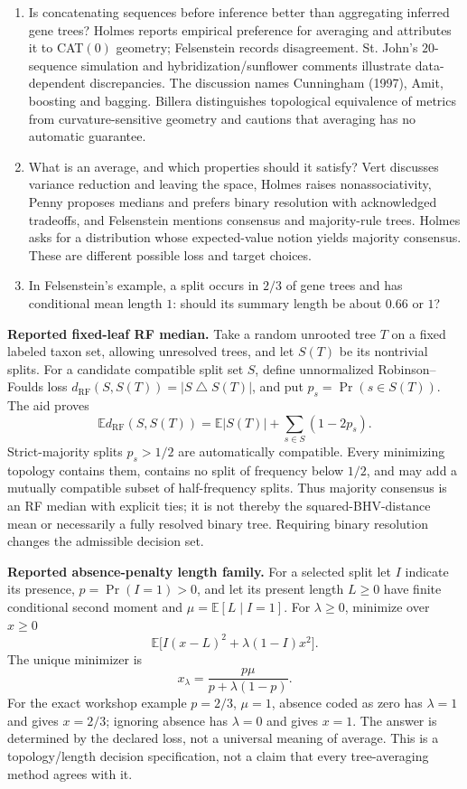 \documentclass[11pt]{article}
\newcommand{\E}{\mathbb{E}}
\begin{document}
\begin{enumerate}
\item Is concatenating sequences before inference better than aggregating inferred gene trees? Holmes reports empirical preference for averaging and attributes it to CAT$(0)$ geometry; Felsenstein records disagreement. St. John's $20$-sequence simulation and hybridization/sunflower comments illustrate data-dependent discrepancies. The discussion names Cunningham (1997), Amit, boosting and bagging. Billera distinguishes topological equivalence of metrics from curvature-sensitive geometry and cautions that averaging has no automatic guarantee.
\item What is an average, and which properties should it satisfy? Vert discusses variance reduction and leaving the space, Holmes raises nonassociativity, Penny proposes medians and prefers binary resolution with acknowledged tradeoffs, and Felsenstein mentions consensus and majority-rule trees. Holmes asks for a distribution whose expected-value notion yields majority consensus. These are different possible loss and target choices.
\item In Felsenstein's example, a split occurs in $2/3$ of gene trees and has conditional mean length $1$: should its summary length be about $0.66$ or $1$?
\end{enumerate}

\textbf{Reported fixed-leaf RF median.} Take a random unrooted tree $T$ on a fixed labeled taxon set, allowing unresolved trees, and let $S(T)$ be its nontrivial splits. For a candidate compatible split set $S$, define unnormalized Robinson--Foulds loss $d_{\mathrm{RF}}(S,S(T))=|S\mathbin{\triangle}S(T)|$, and put $p_s=\Pr(s\in S(T))$. The aid proves
\[
 \E d_{\mathrm{RF}}(S,S(T))=\E|S(T)|+\sum_{s\in S}(1-2p_s).
\]
Strict-majority splits $p_s>1/2$ are automatically compatible. Every minimizing topology contains them, contains no split of frequency below $1/2$, and may add a mutually compatible subset of half-frequency splits. Thus majority consensus is an RF median with explicit ties; it is not thereby the squared-BHV-distance mean or necessarily a fully resolved binary tree. Requiring binary resolution changes the admissible decision set.

\textbf{Reported absence-penalty length family.} For a selected split let $I$ indicate its presence, $p=\Pr(I=1)>0$, and let its present length $L\geq0$ have finite conditional second moment and $\mu=\E[L\mid I=1]$. For $\lambda\geq0$, minimize over $x\geq0$
\[
 \E\big[I(x-L)^2+\lambda(1-I)x^2\big].
\]
The unique minimizer is
\[
 x_\lambda=\frac{p\mu}{p+\lambda(1-p)}.
\]
For the exact workshop example $p=2/3$, $\mu=1$, absence coded as zero has $\lambda=1$ and gives $x=2/3$; ignoring absence has $\lambda=0$ and gives $x=1$. The answer is determined by the declared loss, not a universal meaning of average. This is a topology/length decision specification, not a claim that every tree-averaging method agrees with it.
\end{document}
